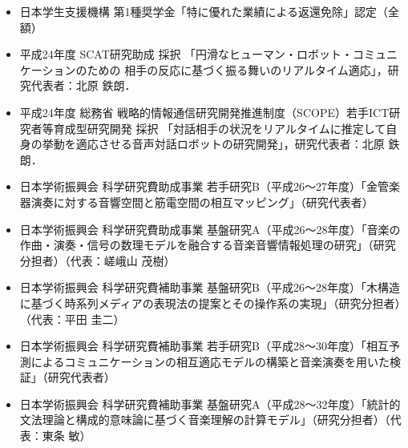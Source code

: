 \begin{itemize}
\item 
日本学生支援機構 第1種奨学金「特に優れた業績による返還免除」認定（全額）\par

\item 
平成24年度 SCAT研究助成 採択 
「円滑なヒューマン・ロボット・コミュニケーションのための
相手の反応に基づく振る舞いのリアルタイム適応」，研究代表者：北原 鉄朗．\par

\item 
平成24年度 総務省 戦略的情報通信研究開発推進制度（SCOPE）若手ICT研究者等育成型研究開発 採択
「対話相手の状況をリアルタイムに推定して自身の挙動を適応させる音声対話ロボットの研究開発」，研究代表者：北原 鉄朗．\par

\item 
日本学術振興会 科学研究費助成事業 若手研究B（平成26〜27年度）「金管楽器演奏に対する音響空間と筋電空間の相互マッピング」（研究代表者）\par

\item 
日本学術振興会 科学研究費助成事業 基盤研究A（平成26〜28年度）「音楽の作曲・演奏・信号の数理モデルを融合する音楽音響情報処理の研究」（研究分担者）（代表：嵯峨山 茂樹）\par

\item 
日本学術振興会 科学研究費補助事業 基盤研究B（平成26〜28年度）「木構造に基づく時系列メディアの表現法の提案とその操作系の実現」（研究分担者）（代表：平田 圭二）\par

\item 
日本学術振興会 科学研究費補助事業 若手研究B（平成28〜30年度）「相互予測によるコミュニケーションの相互適応モデルの構築と音楽演奏を用いた検証」（研究代表者）\par

\item 
日本学術振興会 科学研究費補助事業 基盤研究A（平成28〜32年度）「統計的文法理論と構成的意味論に基づく音楽理解の計算モデル」（研究分担者）（代表：東条 敏）\par

\end{itemize}

